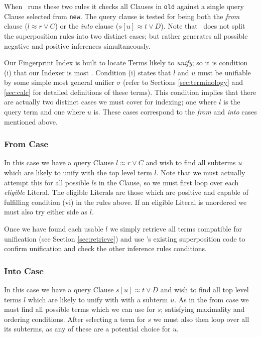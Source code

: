 When \beagle\ runs these two rules it checks all Clauses in \verb!old! against
a single query Clause selected from \verb!new!. The query clause is tested
for being both the \emph{from} clause ($l \approx r \lor C$) or the \emph{into}
clause ($s[u] \approx t \lor D$). Note that \beagle\ does not split the superposition rules into
two distinct cases; but rather generates all possible negative and positive inferences simultaneously.

Our Fingerprint Index is built to locate Terms likely to \emph{unify}; so
it is condition (i) that our Indexer is most . Condition (i) states that
$l$ and $u$ must be unifiable by some simple most general unifier $\sigma$ (refer
to Sections \ref{sec:terminology} and \ref{sec:calc} for detailed definitions of
these terms). This condition implies that there are actually two distinct
cases we must cover for indexing; one where $l$ is the query term and one where $u$ is.
These cases correspond to the \emph{from} and \emph{into} cases mentioned
above.

\subsubsection{From Case}
In this case we have a query Clause $l \approx r \lor C$ and wish to find all
subterms $u$ which are likely to unify with the top level term $l$. Note that we must actually
attempt this for all possible $l$s in the Clause, so we must first loop over
each \emph{eligible} Literal. The eligible Literals are those which are positive and capable
of fulfilling condition (vi) in the rules above. If an eligible Literal is unordered we
must also try either side as $l$.

Once we have found each usable $l$ we simply retrieve all terms compatible for unification
(see Section \ref{sec:retrieve}) and use \beagle's existing superposition code
to confirm unification and check the other inference rules conditions.

\subsubsection{Into Case}
In this case we have a query Clause $s[u] \approx t \lor D$ and wish to find all
top level terms $l$ which are likely to unify with with a subterm $u$. As in the
from case we must find all possible terms which we can use for $s$; satisfying
maximality and ordering conditions. After selecting a term for $s$ we must 
also then loop over all its subterms, as any of these are a potential choice
for $u$.

